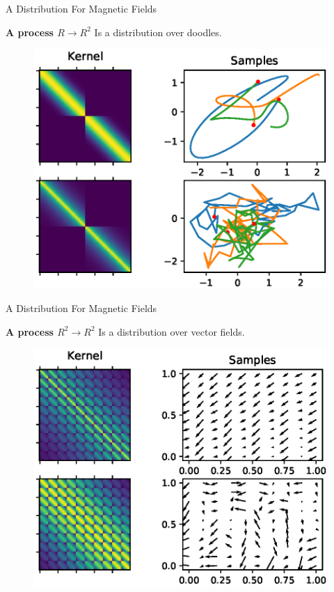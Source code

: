 \documentclass{beamer}
\begin{document}
\begin{frame}{A Distribution For Magnetic Fields}

  \textbf{A process $R \rightarrow R^2$} Is a distribution over doodles.
  \begin{figure}
    \includegraphics[width=\linewidth]{plots/parametric_curves.eps}
  \end{figure}

\end{frame}


\begin{frame}{A Distribution For Magnetic Fields}

  \textbf{A process $R^2 \rightarrow R^2$} Is a distribution over vector fields.
  \begin{figure}
    \includegraphics[width=\linewidth]{plots/vector_fields.eps}
  \end{figure}

\end{frame}
\end{document}

